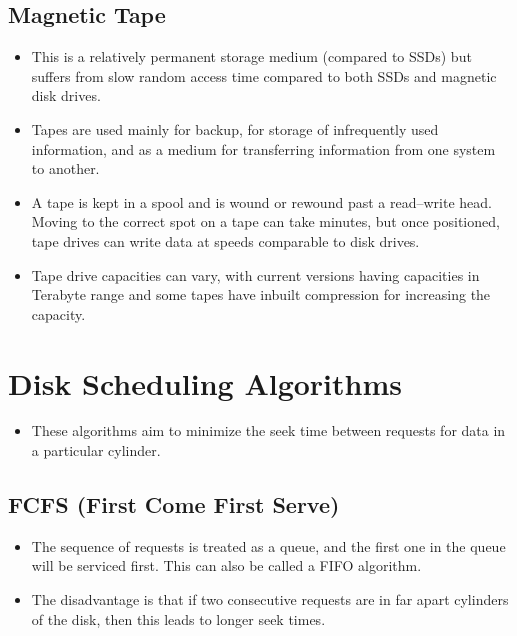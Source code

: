 \documentclass{article}
\theoremstyle{plain}
\theoremstyle{definition}
\begin{document}
\subsection{Magnetic Tape}
\begin{itemize}
    \item This is a relatively permanent storage medium (compared to SSDs) but suffers from slow random access time compared to both SSDs and magnetic disk drives. 
    
    \item Tapes are used mainly for backup, for storage of infrequently used information, and as a medium for transferring information from one system to another.
    
    \item A tape is kept in a spool and is wound or rewound past a read–write head. Moving to the correct spot on a tape can take minutes, but once positioned, tape drives can write data at speeds comparable to disk drives.
    
    \item Tape drive capacities can vary, with current versions having capacities in Terabyte range and some tapes have inbuilt compression for increasing the capacity.
\end{itemize}

\section{Disk Scheduling Algorithms}
\begin{itemize}
    \item These algorithms aim to minimize the seek time between requests for data in a particular cylinder.
\end{itemize}

\subsection{FCFS (First Come First Serve)}
\begin{itemize}
    \item The sequence of requests is treated as a queue, and the first one in the queue will be serviced first. This can also be called a FIFO algorithm. 
    
    \item The disadvantage is that if two consecutive requests are in far apart cylinders of the disk, then this leads to longer seek times.
\end{itemize}
\end{document}
